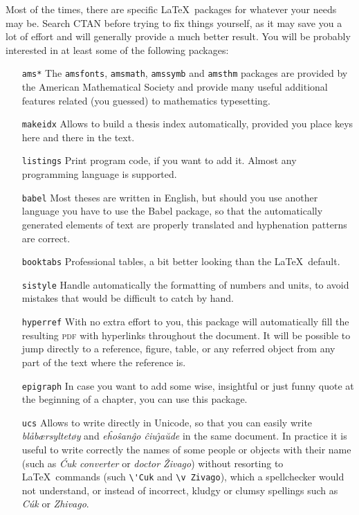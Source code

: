 \documentclass[a4paper,10pt]{article}
\begin{document}
Most of the times, there are specific \LaTeX\ packages for whatever your needs may be. Search CTAN before trying to fix things yourself, as it may save you a lot of effort and will generally provide a much better result. You will be probably interested in at least some of the following packages:
\begin{itemize}
\item[\texttt{ams*}] The \texttt{amsfonts}, \texttt{amsmath}, \texttt{amssymb} and \texttt{amsthm} packages are provided by the American Mathematical Society and provide many useful additional features related (you guessed) to mathematics typesetting.
\item[\texttt{makeidx}] Allows to build a thesis index automatically, provided you place keys here and there in the text.
\item[\texttt{listings}] Print program code, if you want to add it. Almost any programming language is supported.
\item[\texttt{babel}] Most theses are written in English, but should you use another language you have to use the Babel package, so that the automatically generated elements of text are properly translated and hyphenation patterns are correct.
\item[\texttt{booktabs}] Professional tables, a bit better looking than the \LaTeX\ default.
\item[\texttt{sistyle}] Handle automatically the formatting of numbers and units, to avoid mistakes that would be difficult to catch by hand.
\item[\texttt{hyperref}] With no extra effort to you, this package will automatically fill the resulting \textsc{pdf} with hyperlinks throughout the document. It will be possible to jump directly to a reference, figure, table, or any referred object from any part of the text where the reference is.
\item[\texttt{epigraph}] In case you want to add some wise, insightful or just funny quote at the beginning of a chapter, you can use this package.
\item[\texttt{ucs}] Allows to write directly in Unicode, so that you can easily write \emph{bl\aa\-b\ae r\-syltet\o y} and \emph{e\^ho\-\^san\^go \^ciu\-\^\j a\u ude} in the same document. In practice it is useful to write correctly the names of some people or objects with their name (such as \emph{\'Cuk converter} or \emph{doctor \v Zivago}) without resorting to \LaTeX\ commands (such \verb|\'Cuk| and \verb|\v Zivago|), which a spellchecker would not understand, or instead of incorrect, kludgy or clumsy spellings such as \emph{C\'uk} or \emph{Zhivago}.

\end{itemize}
\end{document}
